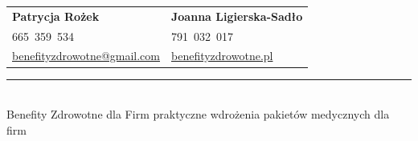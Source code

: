 \documentclass[11pt,a4paper]{article}
{
\small\color{textgray}Benefity Zdrowotne dla Firm \textbar{} praktyczne wdrożenia pakiet\'ow medycznych dla firm}
\begin{document}
\vspace{0.5em}
\noindent
\begin{tabularx}{\textwidth}{@{}X X@{}}
  {\large\bfseries\color{brand}Patrycja Ro\.zek} & {\large\bfseries\color{brand}Joanna Ligierska-Sad\l{}o} \\
  {\Large\color{branddark}665\ 359\ 534} & {\Large\color{branddark}791\ 032\ 017} \\
  \href{mailto:benefityzdrowotne@gmail.com}{benefityzdrowotne@gmail.com} & \href{https://benefityzdrowotne.pl}{benefityzdrowotne.pl}
\end{tabularx}

\vfill
\noindent\textcolor{accent}{\rule{\textwidth}{3pt}}\\[0.25em]
{\small\color{textgray}Benefity Zdrowotne dla Firm \textbar{} praktyczne wdrożenia pakiet\'ow medycznych dla firm}
\end{document}
